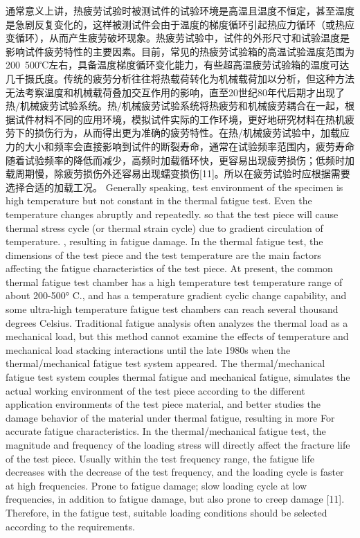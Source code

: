 通常意义上讲，热疲劳试验时被测试件的试验环境是高温且温度不恒定，甚至温度是急剧反复变化的，这样被测试件会由于温度的梯度循环引起热应力循环（或热应变循环），从而产生疲劳破坏现象。热疲劳试验中，试件的外形尺寸和试验温度是影响试件疲劳特性的主要因素。目前，常见的热疲劳试验箱的高温试验温度范围为200~500℃左右，具备温度梯度循环变化能力，有些超高温疲劳试验箱的温度可达几千摄氏度。传统的疲劳分析往往将热载荷转化为机械载荷加以分析，但这种方法无法考察温度和机械载荷叠加交互作用的影响，直至20世纪80年代后期才出现了热/机械疲劳试验系统。热/机械疲劳试验系统将热疲劳和机械疲劳耦合在一起，根据试件材料不同的应用环境，模拟试件实际的工作环境，更好地研究材料在热机疲劳下的损伤行为，从而得出更为准确的疲劳特性。在热/机械疲劳试验中，加载应力的大小和频率会直接影响到试件的断裂寿命，通常在试验频率范围内，疲劳寿命随着试验频率的降低而减少，高频时加载循环快，更容易出现疲劳损伤；低频时加载周期慢，除疲劳损伤外还容易出现蠕变损伤[11]。所以在疲劳试验时应根据需要选择合适的加载工况。
Generally speaking, test environment of the specimen is high temperature but not constant in the thermal fatigue test. Even the temperature changes abruptly and repeatedly. so that the test piece will cause thermal stress cycle (or thermal strain cycle) due to gradient circulation of temperature. , resulting in fatigue damage. In the thermal fatigue test, the dimensions of the test piece and the test temperature are the main factors affecting the fatigue characteristics of the test piece. At present, the common thermal fatigue test chamber has a high temperature test temperature range of about 200-500° C., and has a temperature gradient cyclic change capability, and some ultra-high temperature fatigue test chambers can reach several thousand degrees Celsius. Traditional fatigue analysis often analyzes the thermal load as a mechanical load, but this method cannot examine the effects of temperature and mechanical load stacking interactions until the late 1980s when the thermal/mechanical fatigue test system appeared. The thermal/mechanical fatigue test system couples thermal fatigue and mechanical fatigue, simulates the actual working environment of the test piece according to the different application environments of the test piece material, and better studies the damage behavior of the material under thermal fatigue, resulting in more For accurate fatigue characteristics. In the thermal/mechanical fatigue test, the magnitude and frequency of the loading stress will directly affect the fracture life of the test piece. Usually within the test frequency range, the fatigue life decreases with the decrease of the test frequency, and the loading cycle is faster at high frequencies. Prone to fatigue damage; slow loading cycle at low frequencies, in addition to fatigue damage, but also prone to creep damage [11]. Therefore, in the fatigue test, suitable loading conditions should be selected according to the requirements.


